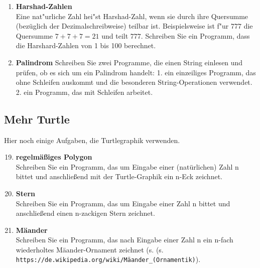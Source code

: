 \begin{enumerate}[1.]
\item \textbf{Harshad-Zahlen}\\
Eine nat"urliche Zahl hei"st Harshad-Zahl, wenn sie durch ihre Quersumme (bezüglich der Dezimalschreibweise) teilbar ist. Beispielsweise ist f"ur $777$ die Quersumme $7+7+7=21$ und teilt $777$.
Schreiben Sie ein Programm, dass die Harshard-Zahlen von 1 bis 100 berechnet.
\item \textbf{Palindrom} 
Schreiben Sie zwei Programme, die einen String einlesen und prüfen,
ob es sich um ein Palindrom handelt: 1. ein einzeiliges Programm, das ohne
Schleifen auskommt und die besonderen String-Operationen verwendet. 2. ein Programm,
das mit Schleifen arbeitet.
\end{enumerate}

\subsection*{Mehr Turtle}

Hier noch einige Aufgaben, die Turtlegraphik verwenden.


\begin{enumerate}
\setcounter{enumi}{18}
\item \textbf{regelmäßiges Polygon}\\
Schreiben Sie ein Programm, das um Eingabe einer (natürlichen) Zahl n 
bittet und anschließend  mit der Turtle-Graphik ein n-Eck zeichnet.
\item \textbf{Stern}\\
Schreiben Sie ein Programm, das um Eingabe einer Zahl n 
bittet und anschließend einen n-zackigen Stern zeichnet.
\item \textbf{Mäander}\\
Schreiben Sie ein Programm, das nach Eingabe einer Zahl n 
ein n-fach wiederholtes Mäander-Ornament zeichnet (s.  (s. \texttt{https://de.wikipedia.org/wiki/Mäander\_(Ornamentik)}).
\end{enumerate}




